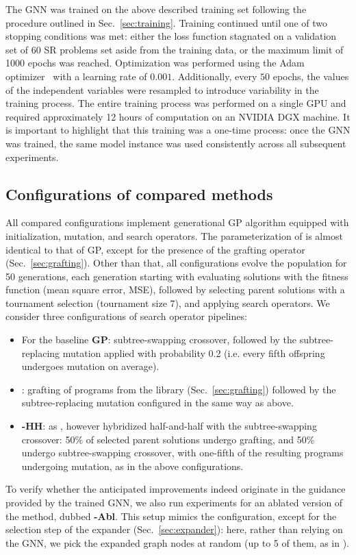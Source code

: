 The GNN was trained on the above described training set following the procedure outlined in Sec.\ \ref{sec:training}. Training continued until one of two stopping conditions was met: either the loss function stagnated on a validation set of 60 SR problems set aside from the training data, or the maximum limit of 1000 epochs was reached. Optimization was performed using the Adam optimizer~\cite{DBLP:journals/corr/KingmaB14} with a learning rate of \(0.001\).
Additionally, every $50$ epochs, the values of the independent variables were resampled to introduce variability in the training process.
The entire training process was performed on a single GPU and required approximately 12 hours of computation on an NVIDIA DGX machine.
It is important to highlight that this training was a one-time process: once the GNN was trained, the same model instance was used consistently across all subsequent experiments.


\subsection{Configurations of compared methods}\label{sec:method-config}

All compared configurations implement generational GP algorithm equipped with initialization, mutation, and search operators. The parameterization of \mname is almost identical to that of GP, except for the presence of the grafting operator (Sec.\ \ref{sec:grafting}). Other than that, all configurations evolve the population for 50 generations, each generation starting with evaluating solutions with the fitness function (mean square error, MSE), followed by selecting parent solutions with a tournament selection (tournament size 7), and applying search operators. We consider three configurations of search operator pipelines:
\begin{itemize}
    \item For the baseline \textbf{GP}: subtree-swapping crossover, followed by the subtree-replacing mutation applied with probability 0.2 (i.e. every fifth offspring undergoes mutation on average).
    \item \textbf{\mname}: grafting of programs from the library (Sec.\ \ref{sec:grafting}) followed by the subtree-replacing mutation configured in the same way as above. 
    \item \textbf{\mname-HH}: as \mname, however hybridized half-and-half with the subtree-swapping crossover: 50\% of selected parent solutions undergo grafting, and 50\% undergo subtree-swapping crossover, with one-fifth of the resulting programs undergoing mutation, as in the above configurations.    
\end{itemize}
To verify whether the anticipated improvements indeed originate in the guidance provided by the trained GNN, we also run experiments for an ablated version of the method, dubbed \textbf{\mname-Abl}. This setup mimics the \mname configuration, except for the selection step of the expander (Sec.\ \ref{sec:expander}): here, rather than relying on the GNN, we pick the expanded graph nodes at random (up to 5 of them, as in \mname). 

